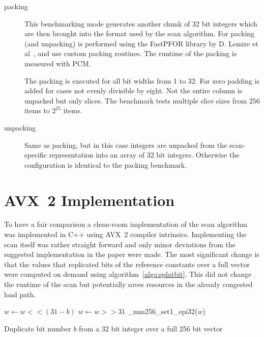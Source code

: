 \begin{description}
\item[packing]
  This benchmarking mode generates another chunk of 32 bit integers which are
  then brought into the format used by the scan algorithm. For \simdscan{}
  packing (and unpacking) is performed using the FastPFOR library by D. Lemire
  et al~\cite{fastpfor}, \bwv{} and \bs{} use
  custom packing routines. The runtime of the packing is measured with PCM.

  The packing is executed for all bit widths from 1 to 32. For \bs{} zero
  padding is added for cases not evenly divisible by eight. Not the entire
  column is unpacked but only slices. The benchmark tests multiple slice sizes
  from $256$ items to $2^{25}$ items.

\item[unpacking]
  Same as packing, but in this case integers are unpacked from the
  scan-specific representation into an array of 32 bit integers. Otherwise the
  configuration is identical to the packing benchmark.
\end{description}

\section{AVX~2 \bwv{} Implementation}

To have a fair comparison a clean-room implementation of the \bwv{} scan
algorithm was implemented in C++ using AVX~2 compiler intrinsics. Implementing
the scan itself was rather straight forward and only minor deviations from the
suggested implementation in the paper were made. The most significant change is
that the values that replicated bits of the reference constants over a full
vector were computed on demand using algorithm~\ref{algo:splatbit}. This did not
change the runtime of the scan but potentially saves resources in the already
congested load path.

\begin{algorithm}[h]
\begin{algorithmic}[1]
  \State $w \gets w << (31-b)$ 
  \State $w \gets w >> 31$ 
  \State \Return \_mm256\_set1\_epi32($w$) 
  \EndProcedure
\end{algorithmic}
\caption{Duplicate bit number $b$ from a 32 bit integer over a
full 256 bit vector}
\label{algo:splatbit}
\end{algorithm}

